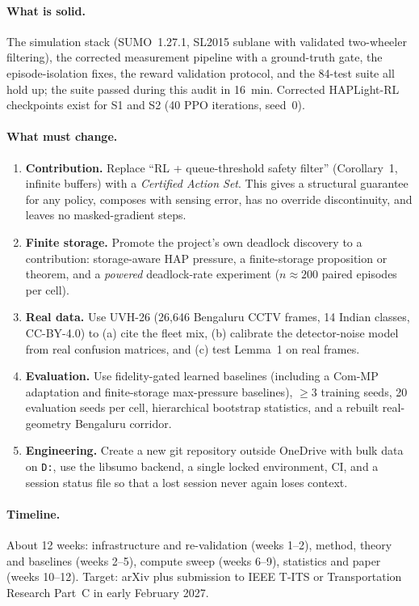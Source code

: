 \documentclass[11pt,a4paper]{article}
\begin{document}
\paragraph{What is solid.}
The simulation stack (SUMO~1.27.1, SL2015 sublane with validated two-wheeler filtering),
the corrected measurement pipeline with a ground-truth gate, the episode-isolation fixes,
the reward validation protocol, and the 84-test suite all hold up; the suite passed during
this audit in 16~min. Corrected HAPLight-RL checkpoints exist for S1 and S2 (40 PPO
iterations, seed~0).

\paragraph{What must change.}
\begin{enumerate}
\item \textbf{Contribution.} Replace ``RL + queue-threshold safety filter'' (Corollary~1,
      infinite buffers) with a \emph{Certified Action Set}. This gives a structural guarantee
      for any policy, composes with sensing error, has no override discontinuity, and
      leaves no masked-gradient steps.
\item \textbf{Finite storage.} Promote the project's own deadlock discovery to a
      contribution: storage-aware HAP pressure, a finite-storage proposition or theorem,
      and a \emph{powered} deadlock-rate experiment ($n\approx200$ paired episodes per cell).
\item \textbf{Real data.} Use UVH-26 (26{,}646 Bengaluru CCTV frames, 14 Indian classes,
      CC-BY-4.0) to (a) cite the fleet mix, (b) calibrate the detector-noise model from real
      confusion matrices, and (c) test Lemma~1 on real frames.
\item \textbf{Evaluation.} Use fidelity-gated learned baselines (including a Com-MP
      adaptation and finite-storage max-pressure baselines), $\ge$3 training seeds, 20
      evaluation seeds per cell, hierarchical bootstrap statistics, and a rebuilt
      real-geometry Bengaluru corridor.
\item \textbf{Engineering.} Create a new git repository outside OneDrive with bulk data on
      \texttt{D:}, use the libsumo backend, a single locked environment, CI, and a session
      status file so that a lost session never again loses context.
\end{enumerate}

\paragraph{Timeline.} About 12 weeks: infrastructure and re-validation (weeks 1--2), method,
theory and baselines (weeks 2--5), compute sweep (weeks 6--9), statistics and paper
(weeks 10--12). Target: arXiv plus submission to IEEE T-ITS or Transportation Research
Part~C in early February 2027.
\end{document}
